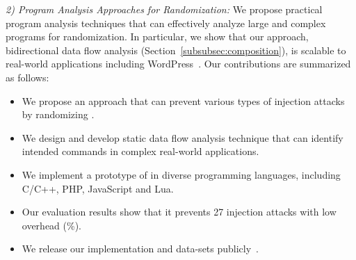 {\it 2)  Program Analysis Approaches for  Randomization:}
We propose practical program analysis techniques that can effectively analyze large and complex programs for  randomization. 
In particular, we show that our approach, bidirectional data flow analysis (Section~\ref{subsubsec:composition}), is scalable to real-world applications including WordPress~\cite{wordpress}.
Our contributions are summarized as follows:

\vspace{-0.5em}
\begin{itemize}[leftmargin=*]
    \item We propose an approach that can prevent various types of  injection attacks by randomizing .
    
    \item We design and develop  static data flow analysis technique  that can identify intended commands in complex real-world applications. 
    
    \item  We implement a prototype of \sysname in diverse programming languages, including C/C++, PHP, JavaScript and Lua. %
    
    \item Our evaluation results show that it prevents 27  injection attacks with low overhead (\%).
    
    \item  We release our implementation and data-sets publicly~\cite{csr-tool}.
    
\end{itemize}

